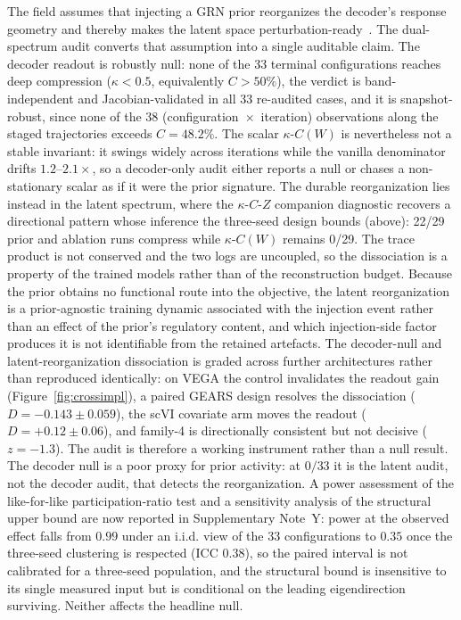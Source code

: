 \documentclass[11pt,a4paper]{article}
\begin{document}
The field assumes that injecting a GRN prior reorganizes the decoder's response
geometry and thereby makes the latent space perturbation-ready~\cite{kamimoto2023,lopez2018,vega}.
The dual-spectrum audit converts that assumption into a single auditable claim. The
decoder readout is robustly null: none of the 33 terminal configurations reaches deep
compression ($\kappa<0.5$, equivalently $C>50\%$), the verdict is band-independent and
Jacobian-validated in all 33 re-audited cases, and it is snapshot-robust, since none of
the 38 (configuration~$\times$~iteration) observations along the staged trajectories
exceeds $C=48.2\%$. The scalar $\kappa$-$C(W)$ is nevertheless not a stable invariant:
it swings widely across iterations while the vanilla denominator drifts $1.2$--$2.1\times$,
so a decoder-only audit either reports a null or chases a non-stationary scalar as if it
were the prior signature. The durable reorganization lies instead in the latent spectrum, where the
$\kappa$-$C$-$Z$ companion diagnostic recovers a directional pattern whose
inference the three-seed design bounds (above): 22/29 prior and ablation runs
compress while $\kappa$-$C(W)$ remains 0/29. The trace product is not
conserved and the two logs are uncoupled, so the dissociation is a property of the trained
models rather than of the reconstruction budget. Because the prior obtains no functional
route into the objective, the latent reorganization is a prior-agnostic training dynamic
associated with the injection event rather than an effect of the prior's regulatory
content, and which injection-side factor produces it is not identifiable from the
retained artefacts. The decoder-null and latent-reorganization dissociation is graded across further architectures rather than reproduced identically: on VEGA the control invalidates the readout gain (Figure~\ref{fig:crossimpl}), a paired GEARS design resolves the dissociation ($D=-0.143\pm0.059$), the scVI covariate arm moves the readout ($D=+0.12\pm0.06$), and family-4 is directionally consistent but not decisive ($z=-1.3$). The audit is therefore a working instrument rather than a null result. The decoder null is a poor proxy for prior
activity: at $0/33$ it is the latent audit, not the decoder audit, that detects the
reorganization. A power assessment of the like-for-like participation-ratio test and a
sensitivity analysis of the structural upper bound are now reported in
Supplementary Note~Y: power at the observed effect falls from $0.99$ under an
i.i.d. view of the $33$ configurations to $0.35$ once the three-seed clustering is
respected (ICC $0.38$), so the paired interval is not calibrated for a three-seed
population, and the structural bound is insensitive to its single measured input but
is conditional on the leading eigendirection surviving. Neither affects the headline null.
\end{document}
